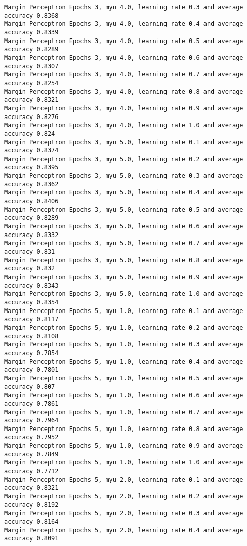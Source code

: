 \begin{Verbatim}[fontsize=\small]
Margin Perceptron Epochs 3, myu 4.0, learning rate 0.3 and average accuracy 0.8368
Margin Perceptron Epochs 3, myu 4.0, learning rate 0.4 and average accuracy 0.8339
Margin Perceptron Epochs 3, myu 4.0, learning rate 0.5 and average accuracy 0.8289
Margin Perceptron Epochs 3, myu 4.0, learning rate 0.6 and average accuracy 0.8307
Margin Perceptron Epochs 3, myu 4.0, learning rate 0.7 and average accuracy 0.8254
Margin Perceptron Epochs 3, myu 4.0, learning rate 0.8 and average accuracy 0.8321
Margin Perceptron Epochs 3, myu 4.0, learning rate 0.9 and average accuracy 0.8276
Margin Perceptron Epochs 3, myu 4.0, learning rate 1.0 and average accuracy 0.824
Margin Perceptron Epochs 3, myu 5.0, learning rate 0.1 and average accuracy 0.8374
Margin Perceptron Epochs 3, myu 5.0, learning rate 0.2 and average accuracy 0.8395
Margin Perceptron Epochs 3, myu 5.0, learning rate 0.3 and average accuracy 0.8362
Margin Perceptron Epochs 3, myu 5.0, learning rate 0.4 and average accuracy 0.8406
Margin Perceptron Epochs 3, myu 5.0, learning rate 0.5 and average accuracy 0.8289
Margin Perceptron Epochs 3, myu 5.0, learning rate 0.6 and average accuracy 0.8332
Margin Perceptron Epochs 3, myu 5.0, learning rate 0.7 and average accuracy 0.831
Margin Perceptron Epochs 3, myu 5.0, learning rate 0.8 and average accuracy 0.832
Margin Perceptron Epochs 3, myu 5.0, learning rate 0.9 and average accuracy 0.8343
Margin Perceptron Epochs 3, myu 5.0, learning rate 1.0 and average accuracy 0.8354
Margin Perceptron Epochs 5, myu 1.0, learning rate 0.1 and average accuracy 0.8117
Margin Perceptron Epochs 5, myu 1.0, learning rate 0.2 and average accuracy 0.8108
Margin Perceptron Epochs 5, myu 1.0, learning rate 0.3 and average accuracy 0.7854
Margin Perceptron Epochs 5, myu 1.0, learning rate 0.4 and average accuracy 0.7801
Margin Perceptron Epochs 5, myu 1.0, learning rate 0.5 and average accuracy 0.807
Margin Perceptron Epochs 5, myu 1.0, learning rate 0.6 and average accuracy 0.7861
Margin Perceptron Epochs 5, myu 1.0, learning rate 0.7 and average accuracy 0.7964
Margin Perceptron Epochs 5, myu 1.0, learning rate 0.8 and average accuracy 0.7952
Margin Perceptron Epochs 5, myu 1.0, learning rate 0.9 and average accuracy 0.7849
Margin Perceptron Epochs 5, myu 1.0, learning rate 1.0 and average accuracy 0.7712
Margin Perceptron Epochs 5, myu 2.0, learning rate 0.1 and average accuracy 0.8321
Margin Perceptron Epochs 5, myu 2.0, learning rate 0.2 and average accuracy 0.8192
Margin Perceptron Epochs 5, myu 2.0, learning rate 0.3 and average accuracy 0.8164
Margin Perceptron Epochs 5, myu 2.0, learning rate 0.4 and average accuracy 0.8091

\end{Verbatim}
